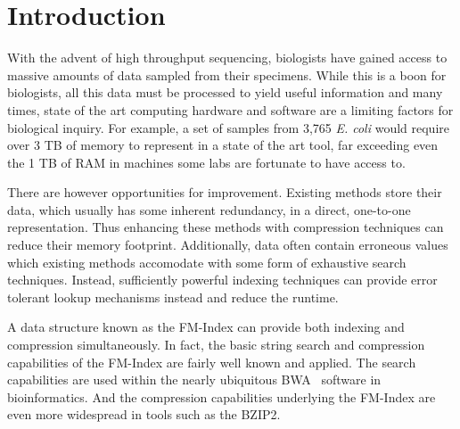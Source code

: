 






































\chapter{Introduction}
\bigskip

With the advent of high throughput sequencing, biologists have gained access to massive amounts of data sampled from their specimens.  While this is a boon for biologists, all this data must be processed to yield useful information and many times, state of the art computing hardware and software are a limiting factors for biological inquiry.  For example, a set of samples from 3,765 \emph{E. coli} would require over 3 TB of memory to represent in a state of the art tool, far exceeding even the 1 TB of RAM in machines some labs are fortunate to have access to.

There are however opportunities for improvement.  Existing methods store their data, which usually has some inherent redundancy, in a direct, one-to-one representation. Thus enhancing these methods with compression techniques can reduce their memory footprint.  Additionally, data often contain erroneous values which existing methods accomodate with some form of exhaustive search techniques.  Instead, sufficiently powerful indexing techniques can provide error tolerant lookup mechanisms instead and reduce the runtime.

A data structure known as the FM-Index can provide both indexing and compression simultaneously.   In fact, the basic string search and compression capabilities of the FM-Index are fairly well known and applied.  The search capabilities are used within the nearly ubiquitous BWA~\cite{bwa} software in bioinformatics.  And the compression capabilities underlying the FM-Index are even more widespread in tools such as the BZIP2.

